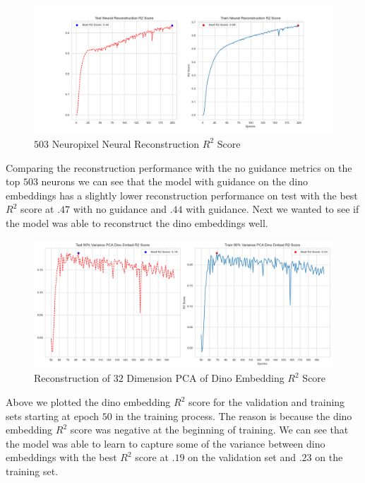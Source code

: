 \documentclass[12pt, letterpaper]{article}
\begin{document}
\begin{figure}[H]
    \centering
    \includegraphics[width=1.0\textwidth]{x_r2_128dim_503_top_var_200_epochs_0.05_beta_2_layer_.9_pca_dino_embed.png}
    \caption{$503$ Neuropixel Neural Reconstruction $R^2$ Score}
    \label{fig:vae_guidance_dino_pca}
\end{figure}

Comparing the reconstruction performance with the no guidance metrics on the top $503$ neurons we can see that the model with guidance on the dino embeddings has a slightly lower reconstruction performance on test with the best $R^2$ score at $.47$ with no guidance and $.44$ with guidance. Next we wanted to see if the model was able to reconstruct the dino embeddings well.

\begin{figure}[H]
    \centering
    \includegraphics[width=.9\textwidth]{.9_pca_dino_embed_r2_128dim_503_top_var_200_epochs_0.05_beta_2_layer.png}
    \caption{Reconstruction of $32$ Dimension PCA of Dino Embedding $R^2$ Score}
    \label{fig:vae_guidance_dino_pca_dino_embed_r2}
\end{figure}

Above we plotted the dino embedding $R^2$ score for the validation and training sets starting at epoch $50$ in the training process. The reason is because the dino embedding $R^2$ score was negative at the beginning of training. We can see that the model was able to learn to capture some of the variance between dino embeddings with the best $R^2$ score at $.19$ on the validation set and $.23$ on the training set.
\end{document}
